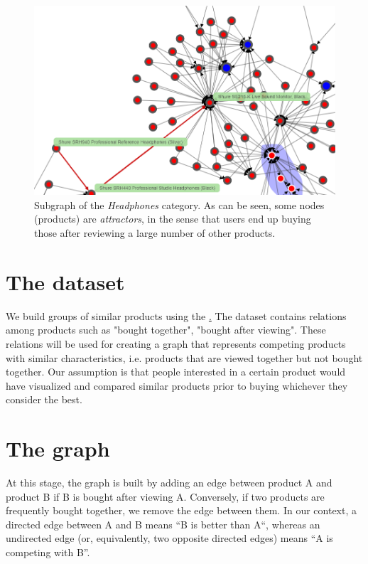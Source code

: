 \documentclass[a4paper,12pt]{article}
\begin{document}
\begin{figure}[H]
	\centering{}
	\includegraphics[width=\textwidth]{img/graph_nav.png}
	\caption{Subgraph of the \emph{Headphones} category. As can be seen, some nodes (products) are \emph{attractors}, in the sense that users end up buying those after reviewing a large number of other products.}
	\label{fig:graphNav}
\end{figure}

\section{The dataset}
We build groups of similar products using the \href{http://jmcauley.ucsd.edu/data/amazon/}. The dataset contains relations among products such as "bought together", "bought after viewing". These relations will be used for creating a graph that represents competing products with similar characteristics, i.e. products that are viewed together but not bought together. Our assumption is that people interested in a certain product would have visualized and compared similar products prior to buying whichever they consider the best.

\section{The graph}
At this stage, the graph is built by adding an edge between product A and product B if B is bought after viewing A. Conversely, if two products are frequently bought together, we remove the edge between them. In our context, a directed edge between A and B means ``B is better than A``, whereas an undirected edge (or, equivalently, two opposite directed edges) means ``A is competing with B''.
\end{document}
